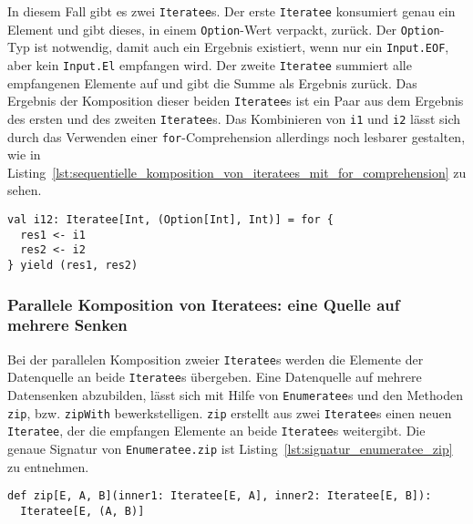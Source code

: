 In diesem Fall gibt es zwei \lstinline|Iteratee|s.
Der erste \lstinline|Iteratee| konsumiert genau ein Element und gibt dieses, in einem \lstinline|Option|-Wert verpackt, zurück.
Der \lstinline|Option|-Typ ist notwendig, damit auch ein Ergebnis existiert, wenn nur ein \lstinline|Input.EOF|, aber kein \lstinline|Input.El| empfangen wird.
Der zweite \lstinline|Iteratee| summiert alle empfangenen Elemente auf und gibt die Summe als Ergebnis zurück.
Das Ergebnis der Komposition dieser beiden \lstinline|Iteratee|s ist ein Paar aus dem Ergebnis des ersten und des zweiten \lstinline|Iteratee|s.
Das Kombinieren von \lstinline|i1| und \lstinline|i2| lässt sich durch das Verwenden einer \lstinline|for|-Comprehension allerdings noch lesbarer gestalten, wie in Listing~\ref{lst:sequentielle_komposition_von_iteratees_mit_for_comprehension} zu sehen.

\begin{lstlisting}[caption=Sequentielle Komposition von Iteratees mit for-Comprehension, label=lst:sequentielle_komposition_von_iteratees_mit_for_comprehension]
val i12: Iteratee[Int, (Option[Int], Int)] = for {
  res1 <- i1
  res2 <- i2
} yield (res1, res2)
\end{lstlisting}


\subsubsection{Parallele Komposition von Iteratees: eine Quelle auf mehrere Senken} %
\label{ssub:anwendung_parallele_komposition_von_iteratees_eine_quelle}

Bei der parallelen Komposition zweier \lstinline|Iteratee|s werden die Elemente der Datenquelle an beide \lstinline|Iteratee|s übergeben.
Eine Datenquelle auf mehrere Datensenken abzubilden, lässt sich mit Hilfe von \lstinline|Enumeratee|s und den Methoden \lstinline|zip|, bzw. \lstinline|zipWith| bewerkstelligen.
\lstinline|zip| erstellt aus zwei \lstinline|Iteratee|s einen neuen \lstinline|Iteratee|, der die empfangen Elemente an beide \lstinline|Iteratee|s weitergibt.
Die genaue Signatur von \lstinline|Enumeratee.zip| ist Listing~\ref{lst:signatur_enumeratee_zip} zu entnehmen.

\begin{lstlisting}[caption=Die Signatur von Enumeratee.zip, label=lst:signatur_enumeratee_zip]
def zip[E, A, B](inner1: Iteratee[E, A], inner2: Iteratee[E, B]):
  Iteratee[E, (A, B)]
\end{lstlisting}

